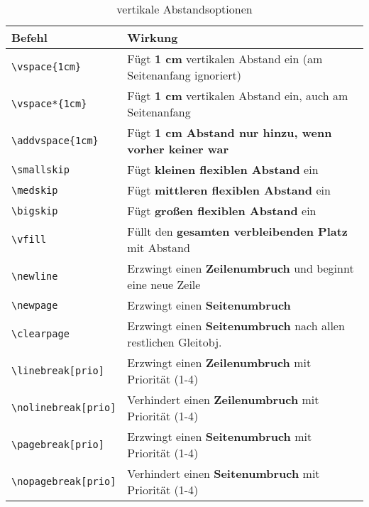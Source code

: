 \begin{table}[h]
    \centering
    \begin{tabular}{lp{10cm}}
        \toprule
        \textbf{Befehl}                           & \textbf{Wirkung}                                                      \\
        \midrule
        \texttt{\textbackslash vspace\{1cm\}}     & Fügt \textbf{1 cm} vertikalen Abstand ein (am Seitenanfang ignoriert) \\
        \texttt{\textbackslash vspace*\{1cm\}}    & Fügt \textbf{1 cm} vertikalen Abstand ein, auch am Seitenanfang       \\
        \texttt{\textbackslash addvspace\{1cm\}}  & Fügt \textbf{1 cm Abstand nur hinzu, wenn vorher keiner war}          \\
        \texttt{\textbackslash smallskip}         & Fügt \textbf{kleinen flexiblen Abstand} ein                           \\
        \texttt{\textbackslash medskip}           & Fügt \textbf{mittleren flexiblen Abstand} ein                         \\
        \texttt{\textbackslash bigskip}           & Fügt \textbf{großen flexiblen Abstand} ein                            \\
        \texttt{\textbackslash vfill}             & Füllt den \textbf{gesamten verbleibenden Platz} mit Abstand           \\
        \midrule
        \texttt{\textbackslash newline}           & Erzwingt einen \textbf{Zeilenumbruch} und beginnt eine neue Zeile     \\
        \texttt{\textbackslash newpage}           & Erzwingt einen \textbf{Seitenumbruch}                                 \\
        \texttt{\textbackslash clearpage}         & Erzwingt einen \textbf{Seitenumbruch} nach allen restlichen Gleitobj. \\
        \texttt{\textbackslash linebreak[prio]}   & Erzwingt einen \textbf{Zeilenumbruch} mit Priorität (1-4)             \\
        \texttt{\textbackslash nolinebreak[prio]} & Verhindert einen \textbf{Zeilenumbruch} mit Priorität (1-4)           \\
        \texttt{\textbackslash pagebreak[prio]}   & Erzwingt einen \textbf{Seitenumbruch} mit Priorität (1-4)             \\
        \texttt{\textbackslash nopagebreak[prio]} & Verhindert einen \textbf{Seitenumbruch} mit Priorität (1-4)           \\
        \bottomrule
    \end{tabular}
    \caption{vertikale Abstandsoptionen}
    \label{tab:vertikale_abstaende}
\end{table}